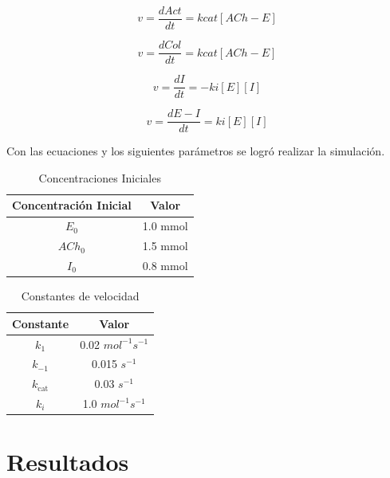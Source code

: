 \begin{equation}
	v= \frac{dAct}{dt} = kcat[ACh-E]
\end{equation}

\begin{equation}
	v= \frac{dCol}{dt} = kcat[ACh-E]
\end{equation}

\begin{equation}
	v= \frac{dI}{dt} = -ki[E][I]
\end{equation}

\begin{equation}
	v= \frac{dE-I}{dt} = ki[E][I]
\end{equation}

Con las ecuaciones y los siguientes parámetros se logró realizar la simulación.

\begin{table}[h]
	\centering
	\begin{tabular}{|c|c|}
		\hline
		\textbf{Concentración Inicial} & \textbf{Valor} \\
		\hline
		$E_0$                          & 1.0 mmol       \\
		\hline
		$ACh_0$                        & 1.5 mmol       \\
		\hline
		$I_0$                          & 0.8 mmol       \\
		\hline
	\end{tabular}
	\caption{Concentraciones Iniciales}
	\label{tab:concentraciones}
\end{table}

\begin{table}[h]
	\centering
	\begin{tabular}{|c|c|}
		\hline
		\textbf{Constante} & \textbf{Valor}         \\
		\hline
		$k_1$              & 0.02 $mol^{-1} s^{-1}$ \\
		\hline
		$k_{-1}$           & 0.015 $s^{-1}$         \\
		\hline
		$k_{\text{cat}}$   & 0.03 $s^{-1}$          \\
		\hline
		$k_i$              & 1.0 $mol^{-1} s^{-1}$  \\
		\hline
	\end{tabular}
	\caption{Constantes de velocidad}
	\label{tab:constantes}
\end{table}

\section{Resultados}

